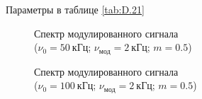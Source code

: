 \documentclass[a4paper, 12pt]{article}
\begin{document}
                Параметры в таблице \ref{tab:D.21}

                \begin{figure}[ht]
                    \begin{minipage}[ht]{0.49\linewidth}
                        \caption{Спектр модулированного сигнала\\($\nu_0 = 50~кГц$; $\nu_{мод} = 2~кГц$; $m = 0.5$)}
                        \label{plot:D.21.1}
                    \end{minipage}
                    \begin{minipage}[ht]{0.49\linewidth}
                        \caption{Спектр модулированного сигнала\\($\nu_0 = 100~кГц$; $\nu_{мод} = 2~кГц$; $m = 0.5$)}
                        \label{plot:D.21.2}
                    \end{minipage}
                \end{figure}
\end{document}
